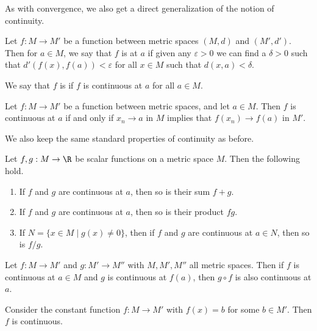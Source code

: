 As with convergence, we also get a direct generalization of the notion of continuity.

\begin{definition}[Continuity]
    Let $f: M \rightarrow M'$ be a function between metric spaces $(M, d)$ and $(M', d')$. Then for $a \in M$, we say that $f$ is  at $a$ if given any $\varepsilon > 0$ we can find a $\delta > 0$ such that $d'(f(x), f(a)) < \varepsilon$ for all $x \in M$ such that $d(x, a) < \delta$.

    We say that $f$ is  if $f$ is continuous at $a$ for all $a \in M$.
\end{definition}

\begin{proposition}
    Let $f: M \rightarrow M'$ be a function between metric spaces, and let $a \in M$. 
    Then $f$ is continuous at $a$ if and only if $x_n \rightarrow a$ in $M$ implies that $f(x_n) \rightarrow f(a)$ in $M'$.
\end{proposition}

We also keep the same standard properties of continuity as before.

\begin{proposition}
	Let $f, g: M \rightarrow \R$ be scalar functions on a metric space $M$. Then the following hold.
	\begin{enumerate}[label=(\roman*)]
		\item If $f$ and $g$ are continuous at $a$, then so is their sum $f + g$.
		\item If $f$ and $g$ are continuous at $a$, then so is their product $fg$.
		\item If $N = \{x \in M \mid g(x)\neq 0\}$, then if $f$ and $g$ are continuous at $a \in N$, then so is $f/g$.
	\end{enumerate}
\end{proposition}

\begin{proposition}
	Let $f: M \rightarrow M'$ and $g: M' \rightarrow M''$ with $M, M', M''$ all metric spaces. Then if $f$ is continuous at $a \in M$ and $g$ is continuous at $f(a)$, then $g \circ f$ is also continuous at $a$.
\end{proposition}

\begin{example}
    Consider the constant function $f: M \rightarrow M'$ with $f(x) = b$ for some $b \in M'$. Then $f$ is continuous.
\end{example}


